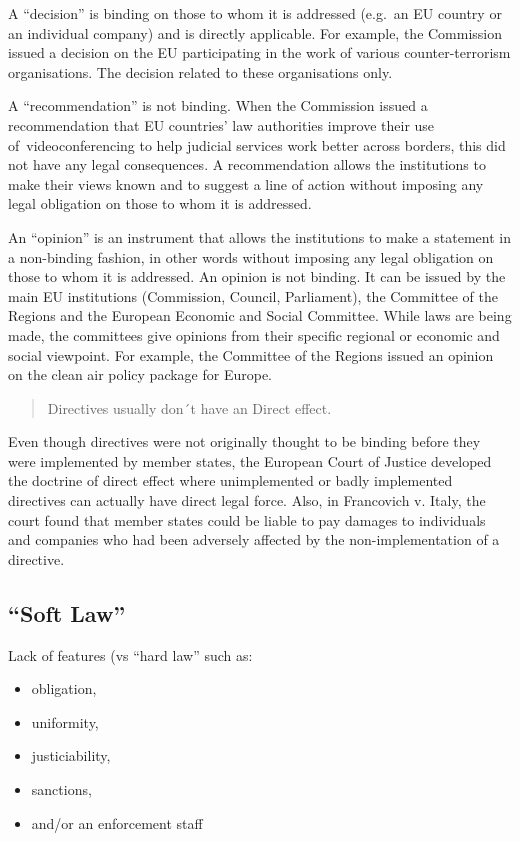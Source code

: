 \documentclass[]{book}
\theoremstyle{definition}
\theoremstyle{definition}
\theoremstyle{definition}
\theoremstyle{remark}
\begin{document}
A ``decision'' is binding on those to whom it is addressed (e.g.~an EU
country or an individual company) and is directly applicable. For
example, the Commission issued a decision on the EU participating in the
work of various counter-terrorism organisations. The decision related to
these organisations only.

A ``recommendation'' is not binding. When the Commission issued a
recommendation that EU countries' law authorities improve their use
of~videoconferencing to help judicial services work better across
borders, this did not have any legal consequences. A recommendation
allows the institutions to make their views known and to suggest a line
of action without imposing any legal obligation on those to whom it is
addressed.

An ``opinion'' is an instrument that allows the institutions to make a
statement in a non-binding fashion, in other words without imposing any
legal obligation on those to whom it is addressed. An opinion is not
binding. It can be issued by the main EU institutions (Commission,
Council, Parliament), the Committee of the Regions and the European
Economic and Social Committee. While laws are being made, the committees
give opinions from their specific regional or economic and social
viewpoint. For example, the Committee of the Regions issued an opinion
on the clean air policy package for Europe.

\begin{quote}
Directives usually don´t have an Direct effect.
\end{quote}

Even though directives were not originally thought to be binding before
they were implemented by member states, the European Court of Justice
developed the doctrine of direct effect where unimplemented or badly
implemented directives can actually have direct legal force. Also, in
Francovich v. Italy, the court found that member states could be liable
to pay damages to individuals and companies who had been adversely
affected by the non-implementation of a directive.

\subsection{\texorpdfstring{``Soft Law''}{Soft Law}}\label{soft-law}

Lack of features (vs ``hard law'' such as:

\begin{itemize}
\item
  obligation,
\item
  uniformity,
\item
  justiciability,
\item
  sanctions,
\item
  and/or an enforcement staff
\end{itemize}
\end{document}
